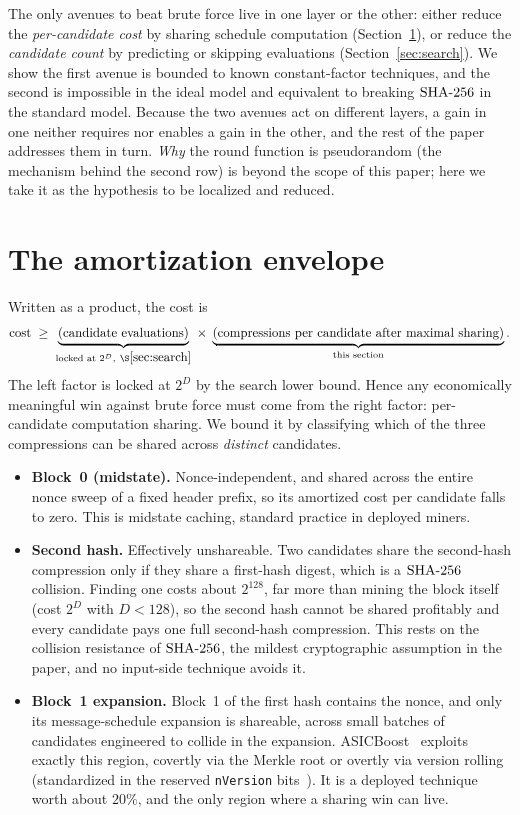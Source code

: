\documentclass[11pt]{article}
\begin{document}
The only avenues to beat brute force live in one layer or the other:
either reduce the \emph{per-candidate cost} by sharing schedule
computation (Section~\ref{sec:amort}), or reduce the \emph{candidate
count} by predicting or skipping evaluations (Section~\ref{sec:search}).
We show the first avenue is bounded to known constant-factor techniques,
and the second is impossible in the ideal model and equivalent to breaking
$\mathrm{SHA\text{-}256}$ in the standard model. Because the two avenues act on different
layers, a gain in one neither requires nor enables a gain in the other,
and the rest of the paper addresses them in turn. \emph{Why} the round
function is pseudorandom (the mechanism behind the second row) is beyond
the scope of this paper; here we take it as the hypothesis to be localized
and reduced.

\section{The amortization envelope}\label{sec:amort}

Written as a product, the cost is
\[
  \text{cost} \;\ge\;
  \underbrace{(\text{candidate evaluations})}_{\text{locked at }2^D,\ \S\ref{sec:search}}
  \;\times\;
  \underbrace{(\text{compressions per candidate after maximal sharing})}_{\text{this section}}.
\]
The left factor is locked at $2^{D}$ by the search lower bound. Hence any
economically meaningful win against brute force must come from the right
factor: per-candidate computation sharing. We bound it by classifying
which of the three compressions can be shared across \emph{distinct}
candidates.

\begin{itemize}
\item \textbf{Block~0 (midstate).} Nonce-independent, and shared across
  the entire nonce sweep of a fixed header prefix, so its amortized cost
  per candidate falls to zero. This is midstate caching, standard practice
  in deployed miners.
\item \textbf{Second hash.} Effectively unshareable. Two candidates share
  the second-hash compression only if they share a first-hash digest,
  which is a $\mathrm{SHA\text{-}256}$ collision. Finding one costs about $2^{128}$, far more
  than mining the block itself (cost $2^{D}$ with $D < 128$), so the
  second hash cannot be shared profitably and every candidate pays one
  full second-hash compression. This rests on the collision resistance of
  $\mathrm{SHA\text{-}256}$, the mildest cryptographic assumption in the paper, and no
  input-side technique avoids it.
\item \textbf{Block~1 expansion.} Block~1 of the first hash contains the
  nonce, and only its message-schedule expansion is shareable, across
  small batches of candidates engineered to collide in the expansion.
  ASICBoost~\cite{asicboost} exploits exactly this region, covertly via
  the Merkle root or overtly via version rolling (standardized in the
  reserved \texttt{nVersion} bits~\cite{bip320}). It is a deployed
  technique worth about $20\%$, and the only region where a sharing win
  can live.
\end{itemize}
\end{document}
